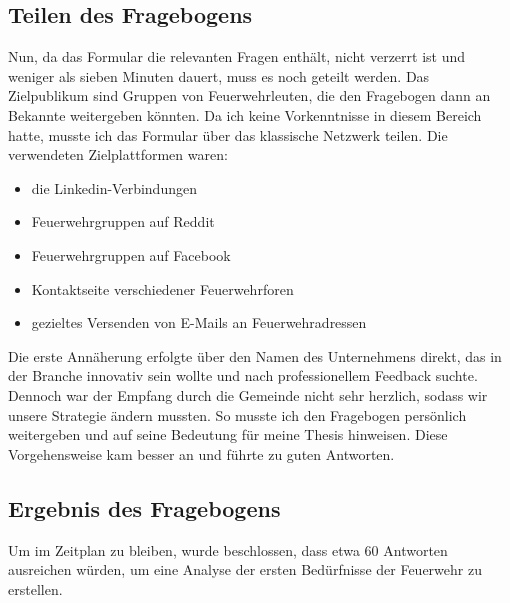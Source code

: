\subsection{Teilen des Fragebogens}

Nun, da das Formular die relevanten Fragen enthält, nicht verzerrt ist und weniger als sieben Minuten dauert, muss es noch geteilt werden.
Das Zielpublikum sind Gruppen von Feuerwehrleuten, die den Fragebogen dann an Bekannte weitergeben könnten.
Da ich keine Vorkenntnisse in diesem Bereich hatte, musste ich das Formular über das klassische Netzwerk teilen.
Die verwendeten Zielplattformen waren:

\begin{itemize}
  \item die Linkedin-Verbindungen
  \item Feuerwehrgruppen auf Reddit
  \item Feuerwehrgruppen auf Facebook
  \item Kontaktseite verschiedener Feuerwehrforen
  \item gezieltes Versenden von E-Mails an Feuerwehradressen
\end{itemize}

Die erste Annäherung erfolgte über den Namen des Unternehmens direkt, das in der Branche innovativ sein wollte und nach professionellem Feedback suchte.
Dennoch war der Empfang durch die Gemeinde nicht sehr herzlich, sodass wir unsere Strategie ändern mussten.
So musste ich den Fragebogen persönlich weitergeben und auf seine Bedeutung für meine Thesis hinweisen.
Diese Vorgehensweise kam besser an und führte zu guten Antworten.

\subsection{Ergebnis des Fragebogens}

Um im Zeitplan zu bleiben, wurde beschlossen, dass etwa 60 Antworten ausreichen würden, um eine Analyse der ersten Bedürfnisse der Feuerwehr zu erstellen.